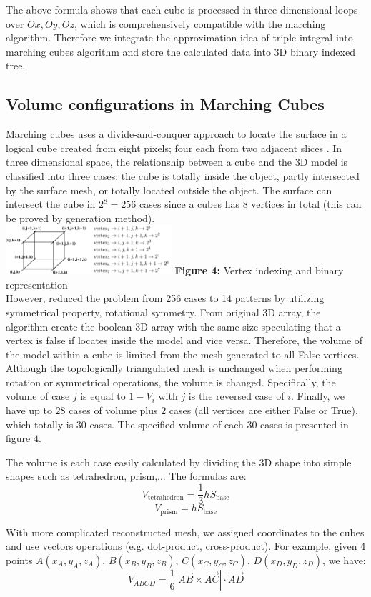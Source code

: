 \documentclass[11pt]{article}
\begin{document}
\begin{multicols}{2}
The above formula shows that each cube is processed in three dimensional loops over $Ox, Oy, Oz$, which is comprehensively compatible with the marching algorithm. Therefore we integrate the approximation idea of triple integral into marching cubes algorithm and store the calculated data into 3D binary indexed tree.

\subsection{Volume configurations in Marching Cubes}

Marching cubes uses a divide-and-conquer approach to locate the surface in a logical cube created from eight pixels; four each from two adjacent slices \cite{loren}. In three dimensional space, the relationship between a cube and the 3D model is classified into three cases: the cube is totally inside the object, partly intersected by the surface mesh, or totally located outside the object. The surface can intersect the cube in $2^8=256$ cases since a cubes has $8$ vertices in total (this can be proved by generation method). \\

\includegraphics[width=0.46\textwidth]{Figures/Binary Vertices.png}
\textbf{Figure 4:} Vertex indexing and binary representation  \\

However, \cite{loren} reduced the problem from 256 cases to 14 patterns by utilizing symmetrical property, rotational symmetry. From original 3D array, the algorithm create the boolean 3D array with the same size speculating that a vertex is false if locates inside the model and vice versa. Therefore, the volume of the model within a cube is limited from the mesh generated to all False vertices. Although the topologically triangulated mesh is unchanged when performing rotation or symmetrical operations, the volume is changed. Specifically, the volume of case $j$ is equal to $1-V_i$ with $j$ is the reversed case of $i$. Finally, we have up to $28$ cases of volume plus $2$ cases (all vertices are either False or True), which totally is $30$ cases. The specified volume of each $30$ cases is presented in figure $4$.

The volume is each case easily calculated by dividing the 3D shape into simple shapes such as tetrahedron, prism,... The formulas are:
$$ V_{\text{tetrahedron}} = \frac{1}{3} h S_{\text{base}} $$
$$ V_{\text{prism}} = h S_{\text{base}} $$ 

With more complicated reconstructed mesh, we assigned coordinates to the cubes and use vectors operations (e.g. dot-product, cross-product). For example, given 4 points $A(x_A,y_A,z_A)$, $B(x_B,y_B,z_B)$, $C(x_C,y_C,z_C)$, $D(x_D,y_D,z_D)$, we have:
$$
V_{ABCD} = \frac{1}{6} |\Vec{AB} \times \Vec{AC}| \cdot \Vec{AD}
$$
\end{multicols}
\end{document}
